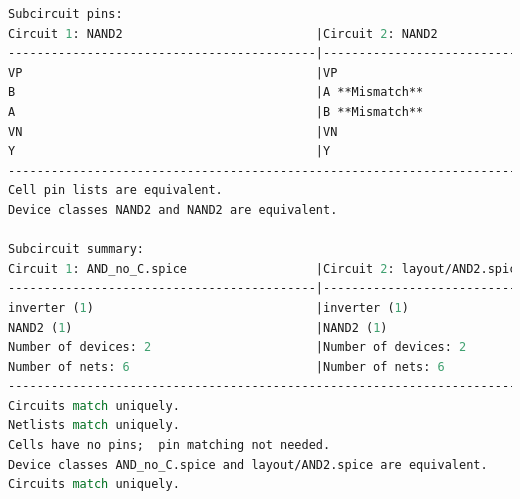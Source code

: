 \documentclass[11pt]{article}
\begin{document}
\begin{lstlisting}[language=tcl, caption=Netgen comparison between Xschem and Magic AND2]
Subcircuit pins:
Circuit 1: NAND2                           |Circuit 2: NAND2                           
-------------------------------------------|----------------------------
VP                                         |VP                                         
B                                          |A **Mismatch**                             
A                                          |B **Mismatch**                             
VN                                         |VN                                         
Y                                          |Y                                          
------------------------------------------------------------------------
Cell pin lists are equivalent.
Device classes NAND2 and NAND2 are equivalent.

Subcircuit summary:
Circuit 1: AND_no_C.spice                  |Circuit 2: layout/AND2.spice               
-------------------------------------------|----------------------------
inverter (1)                               |inverter (1)                               
NAND2 (1)                                  |NAND2 (1)                                  
Number of devices: 2                       |Number of devices: 2                       
Number of nets: 6                          |Number of nets: 6                          
------------------------------------------------------------------------
Circuits match uniquely.
Netlists match uniquely.
Cells have no pins;  pin matching not needed.
Device classes AND_no_C.spice and layout/AND2.spice are equivalent.
Circuits match uniquely.

    \end{lstlisting}
    
\end{document}

